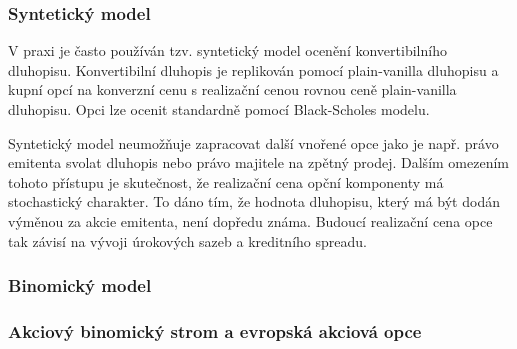 \documentclass[a4paper]{book}
\begin{document}
\subsubsection{Syntetický model}

V praxi je často používán tzv. syntetický model ocenění konvertibilního dluhopisu. Konvertibilní dluhopis je replikován pomocí plain-vanilla dluhopisu a kupní opcí na konverzní cenu s realizační cenou rovnou ceně plain-vanilla dluhopisu. Opci lze ocenit standardně pomocí Black-Scholes modelu.

Syntetický model neumožňuje zapracovat další vnořené opce jako je např. právo emitenta svolat dluhopis nebo právo majitele na zpětný prodej. Dalším omezením tohoto přístupu je skutečnost, že realizační cena opční komponenty má stochastický charakter. To dáno tím, že hodnota dluhopisu, který má být dodán výměnou za akcie emitenta, není dopředu známa. Budoucí realizační cena opce tak závisí na vývoji úrokových sazeb a kreditního spreadu.

\subsubsection{Binomický model}

\subsubsection{Akciový binomický strom a evropská akciová opce}
\end{document}
